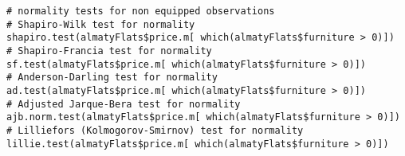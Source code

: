 \documentclass[]{scrartcl}
\begin{document}
%
\begin{lstlisting}[float, caption = Проведение тестов на~нормальность для~наблюдений с~отделимыми улучшениями, firstnumber=1, label= lst:normality-tests-equiped-R]
# normality tests for non equipped observations
# Shapiro-Wilk test for normality
shapiro.test(almatyFlats$price.m[ which(almatyFlats$furniture > 0)])
# Shapiro-Francia test for normality
sf.test(almatyFlats$price.m[ which(almatyFlats$furniture > 0)])
# Anderson-Darling test for normality
ad.test(almatyFlats$price.m[ which(almatyFlats$furniture > 0)])
# Adjusted Jarque-Bera test for normality
ajb.norm.test(almatyFlats$price.m[ which(almatyFlats$furniture > 0)])
# Lilliefors (Kolmogorov-Smirnov) test for normality
lillie.test(almatyFlats$price.m[ which(almatyFlats$furniture > 0)])
\end{lstlisting}
%
\end{document}
